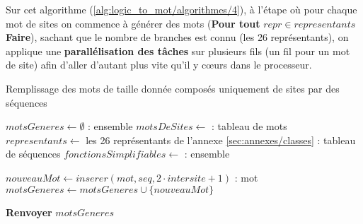 
\begin{wrapfigure}{R}{0cm}
\end{wrapfigure}

\par
Sur cet algorithme (\ref{alg:logic_to_mot/algorithmes/4}), à l'étape où pour chaque mot de sites on commence à générer des mots (\textbf{Pour tout} $repr\in representants$ \textbf{Faire}), sachant que le nombre de branches est connu (les 26 représentants), on applique une \textbf{parallélisation des tâches} sur plusieurs fils (un fil pour un mot de site) afin d'aller d'autant plus vite qu'il y cœurs dans le processeur.

\begin{algorithm}[H]
\caption{Remplissage des mots de taille donnée composés uniquement de sites par des séquences}
\label{alg:logic_to_mot/algorithmes/4}
\begin{algorithmic}

\State $motsGeneres \gets \emptyset$ : ensemble
\State $motsDeSites \gets $ : tableau de mots
\State $representants \gets$ les 26 représentants de l'annexe \ref{sec:annexes/classes} : tableau de séquences
\State $fonctionsSimplifiables \gets$  : ensemble
\State

\State $nouveauMot \gets inserer(mot, seq, 2 \cdot intersite + 1)$ : mot 
 
 
 
\State {}
\EndIf
\EndFor
\EndWhile
{}
\State $motsGeneres \gets motsGeneres \cup \{nouveauMot\}$
\EndIf
\EndFunction
\State

 
 
\State {}
\EndFor
\EndFor
\State \textbf{Renvoyer} $motsGeneres$

\EndProcedure
\end{algorithmic}
\end{algorithm}

